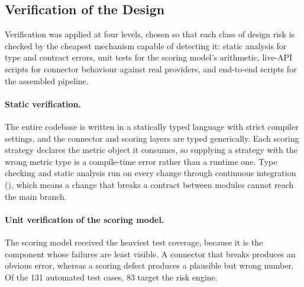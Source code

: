 \subsection{Verification of the Design}
\label{subsec:design-verification}

Verification was applied at four levels, chosen so that each class of design risk
is checked by the cheapest mechanism capable of detecting it: static analysis for
type and contract errors, unit tests for the scoring model's arithmetic, live-API
scripts for connector behaviour against real providers, and end-to-end scripts
for the assembled pipeline.

\paragraph{Static verification.}
The entire codebase is written in a statically typed language with strict
compiler settings, and the connector and scoring layers are typed generically.
Each scoring strategy declares the metric object it consumes, so supplying a
strategy with the wrong metric type is a compile-time error rather than a runtime
one. Type checking and static analysis run on every change through continuous
integration (), which means a change that breaks a
contract between modules cannot reach the main branch.

\paragraph{Unit verification of the scoring model.}
The scoring model received the heaviest test coverage, because it is the
component whose failures are least visible. A connector that breaks produces an
obvious error, whereas a scoring defect produces a plausible but wrong number. Of
the 131 automated test cases, 83 target the risk engine.


